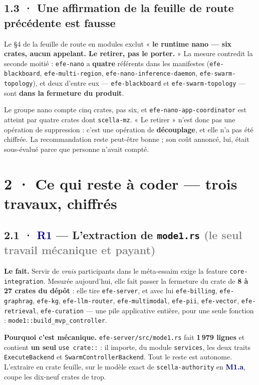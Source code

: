 \documentclass[10pt]{article}
\newcommand{\sz}[1]{\textcolor{grey}{\small\textsf{#1}}}
\newcommand{\code}[1]{\texttt{\small #1}}
\newcommand{\mm}[1]{\textbf{\textcolor{navy}{#1}}}
\begin{document}
\subsection{1.3 · Une affirmation de la feuille de route précédente est fausse}

\begin{alerte}
Le §4 de la feuille de route en modules exclut « \textbf{le runtime nano --- six crates, aucun
appelant. Le retirer, pas le porter.} » La mesure contredit la seconde moitié : \code{efe-nano} a
\textbf{quatre} référents dans les manifestes (\code{efe-blackboard}, \code{efe-multi-region},
\code{efe-nano-inference-daemon}, \code{efe-swarm-topology}), et deux d'entre eux ---
\code{efe-blackboard} et \code{efe-swarm-topology} --- sont \textbf{dans la fermeture du produit}.

Le groupe nano compte cinq crates, pas six, et \code{efe-nano-app-coordinator} est atteint par
quatre crates dont \code{scella-mz}. « Le retirer » n'est donc pas une opération de suppression :
c'est une opération de \textbf{découplage}, et elle n'a pas été chiffrée. La recommandation reste
peut-être bonne ; son coût annoncé, lui, était sous-évalué parce que personne n'avait compté.
\end{alerte}

\section{2 · Ce qui reste à coder --- trois travaux, chiffrés}

\subsection{2.1 · \mm{R1} --- L'extraction de \code{mode1.rs} \sz{(le seul travail mécanique et payant)}}

\textbf{Le fait.} Servir de \emph{vrais} participants dans le méta-essaim exige la feature
\code{core-integration}. Mesurée aujourd'hui, elle fait passer la fermeture du crate de
\textbf{8 à 27 crates du dépôt} : elle tire \code{efe-server}, et avec lui \code{efe-billing},
\code{efe-graphrag}, \code{efe-kg}, \code{efe-llm-router}, \code{efe-multimodal}, \code{efe-pii},
\code{efe-vector}, \code{efe-retrieval}, \code{efe-curation} --- une pile applicative entière, pour
une seule fonction : \code{mode1::build\_mvp\_controller}.

\textbf{Pourquoi c'est mécanique.} \code{efe-server/src/mode1.rs} fait \textbf{1\,979 lignes} et
contient \textbf{un seul} \code{use crate::} : il importe, du module \code{services}, les deux
traits \code{ExecuteBackend} et \code{SwarmControllerBackend}. Tout le reste est autonome. L'extraire en crate feuille, sur
le modèle exact de \code{scella-authority} en \mm{M1.a}, coupe les dix-neuf crates de trop.
\end{document}
